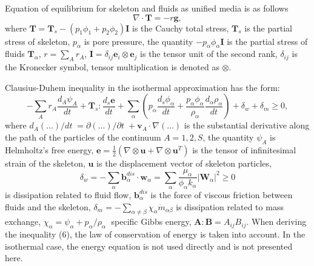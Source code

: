\documentclass[article,authoryear,jpm]{beg_39}             %
\begin{document}
Equation of equilibrium for skeleton and fluids as unified media is as follows
\begin{equation}
\nabla \cdot \mathbf{T}=-r\mathbf{g},
\end{equation}
where $\mathbf{T}={{\mathbf{T}}_{s}}-\left( {{p}_{1}}{{\phi }_{1}}+{{p}_{2}}{{\phi }_{2}} \right)\mathbf{I}$ is the Cauchy total stress, ${{\mathbf{T}}_{s}}$ is the partial stress of skeleton, ${{p}_{\alpha }}$ is pore pressure, the quantity $-{{p}_{\alpha }}{{\phi }_{\alpha }}\mathbf{I}$ is the partial stress of fluids ${{\mathbf{T}}_{\alpha }}$, $r=\sum\limits_{A}{{{r}_{A}}}$, $\mathbf{I}={{\delta }_{ij}}{{\mathbf{e}}_{i}}\otimes {{\mathbf{e}}_{j}}$ is the tensor unit of the second rank, ${{\delta }_{ij}}$ is the Kronecker symbol, tensor multiplication is denoted as $\otimes$.

Clausius-Duhem inequality in the isothermal approximation has the form:
\begin{equation}
-\sum\limits_{A}{{{r}_{A}}\frac{{{d}_{A}}{{\psi }_{A}}}{dt}}+{{\mathbf{T}}_{s}}:\frac{{{d}_{s}}\mathbf{e}}{dt}+\sum\limits_{\alpha }{\left( {{p}_{\alpha }}\frac{{{d}_{s}}{{\phi }_{\alpha }}}{dt}+\frac{{{p}_{\alpha }}{{\phi }_{\alpha }}}{{{\rho }_{\alpha }}}\frac{{{d}_{\alpha }}{{\rho }_{\alpha }}}{dt} \right)}+{{\delta }_{w}}+{{\delta }_{m}}\ge 0,
\end{equation}
where ${{{d}_{A}}\left( ... \right)}/{dt}\;={\partial \left( ... \right)}/{\partial t}\;+{{\mathbf{v}}_{A}}\cdot \nabla (...)$ is the substantial derivative along the path of the particles of the continuum $A=1,2,S$, the quantity ${{\psi }_{A}}$ is Helmholtz’s free energy, $\mathbf{e}=\frac{1}{2}\left( \nabla \otimes \mathbf{u}+\nabla \otimes {{\mathbf{u}}^{T}} \right)$ is the tensor of infinitesimal strain of the skeleton, $\mathbf{u}$ is the displacement vector of skeleton particles, $${{\delta }_{w}}=-\sum\limits_{\alpha }{\mathbf{b}_{\alpha }^{dis}}\cdot {{\mathbf{w}}_{\alpha }}=\sum\limits_{\alpha }{\frac{{{\mu }_{\alpha }}}{{{\phi }_{\alpha }}{{k}_{\alpha }}}{{\left| {{\mathbf{W}}_{\alpha }} \right|}^{2}}}\ge 0$$ is dissipation related to fluid flow, $\mathbf{b}_{\alpha }^{dis}$ is the force of viscous friction between fluids and the skeleton, ${{\delta }_{m}}=-\sum\limits_{\alpha \ne \beta }{{{\chi }_{\alpha }}{{{\dot{m}}}_{\alpha \beta }}}$ is dissipation related to mass exchange, ${{\chi }_{\alpha }}={{\psi }_{\alpha }}+{{{p}_{\alpha }}}/{{{\rho }_{\alpha }}}\;$ specific Gibbs energy, $\mathbf{A}:\mathbf{B}={{A}_{ij}}{{B}_{ij}}$.
When deriving the inequality (6), the law of conservation of energy is taken into account.
In the isothermal case, the energy equation is not used directly and is not presented here.
\end{document}
